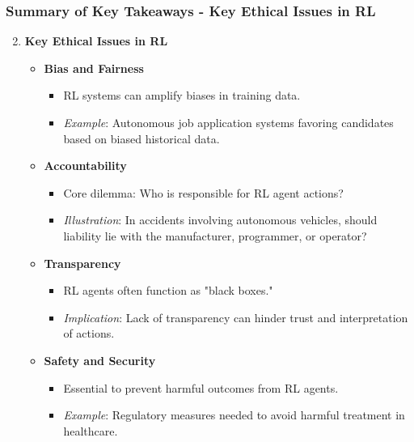 \documentclass[aspectratio=169]{beamer}
\begin{document}
\begin{frame}[fragile]
    \frametitle{Summary of Key Takeaways - Key Ethical Issues in RL}
    \begin{enumerate}
        \setcounter{enumi}{1}
        \item \textbf{Key Ethical Issues in RL}
            \begin{itemize}
                \item \textbf{Bias and Fairness}
                    \begin{itemize}
                        \item RL systems can amplify biases in training data.
                        \item \textit{Example}: Autonomous job application systems favoring candidates based on biased historical data.
                    \end{itemize}
                \item \textbf{Accountability}
                    \begin{itemize}
                        \item Core dilemma: Who is responsible for RL agent actions?
                        \item \textit{Illustration}: In accidents involving autonomous vehicles, should liability lie with the manufacturer, programmer, or operator?
                    \end{itemize}
                \item \textbf{Transparency}
                    \begin{itemize}
                        \item RL agents often function as "black boxes."
                        \item \textit{Implication}: Lack of transparency can hinder trust and interpretation of actions.
                    \end{itemize}
                \item \textbf{Safety and Security}
                    \begin{itemize}
                        \item Essential to prevent harmful outcomes from RL agents.
                        \item \textit{Example}: Regulatory measures needed to avoid harmful treatment in healthcare.
                    \end{itemize}
            \end{itemize}
    \end{enumerate}
\end{frame}
\end{document}
